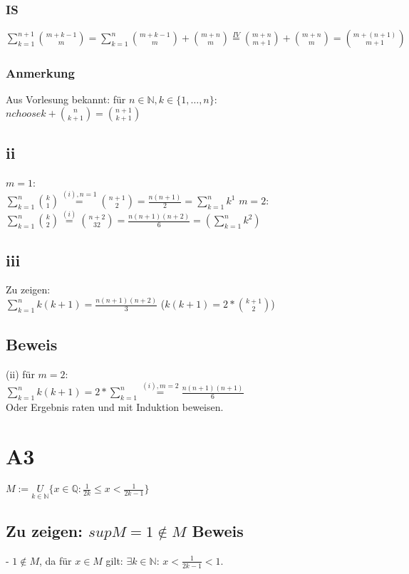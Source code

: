 \documentclass[11pt]{scrartcl}
\begin{document}
\subsubsection*{IS}
$\sum\limits_{k=1}^{n+1} {m+k-1 \choose m} = \sum\limits_{k=1}^{n} {m+k-1 \choose m} + {m+n \choose m} \overset{IV}{=} {m+n \choose  m+1}+ {m+n \choose m} = {m+ (n+1) \choose m+1}$
\subsubsection*{Anmerkung}
Aus Vorlesung bekannt: für $n \in \mathbb{N}, k \in \{1,\dots,n\}$: \\
${n choose k} + {n \choose k+1} = {n+1 \choose k+1}$
\subsection{ii}
$m=1$: \\
$\sum\limits_{k=1}^n {k \choose 1} \overset{(i), n=1}{=} {n+1 \choose 2} = \frac{n(n+1)}{2} = \sum\limits_{k=1}^n k^1$
$m=2$: \\
$\sum\limits_{k=1}^n {k \choose 2} \overset{(i)}{=} {n+2 \choose32} = \frac{n(n+1)(n+2)}{6} = (\sum\limits_{k=1}^n k^2)$

\subsection{iii}
Zu zeigen: \\
$\sum\limits_{k=1}^n k(k+1) = \frac{n(n+1)(n+2)}{3}$ ($k(k+1) = 2*{k+1 \choose 2}$)
\subsection*{Beweis}
(ii) für $m=2$: \\
$\sum\limits_{k=1}^n k(k+1) = 2* \sum\limits_{k=1}^n \overset{(i),m=2}{=} \frac{n(n+1)(n+1)}{6}$ \\
Oder Ergebnis raten und mit Induktion beweisen.

\section{A3}
$M := \underset{k \in \mathbb{N}}{U}  \{x \in\mathbb{Q} : \frac{1}{2k} \leq x < \frac{1}{2k - 1} \}$ \\

\subsection*{Zu zeigen: $sup M=1 \notin M$ Beweis}
-  $1 \notin M$, da für $x \in M$ gilt: $\exists k \in \mathbb{N}$: $x < \frac{1}{2k-1} < 1$. \\
\end{document}
